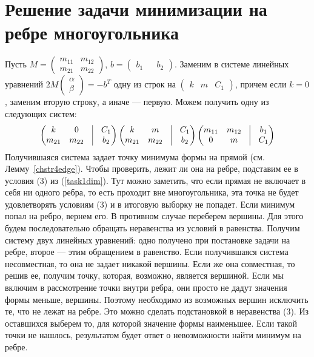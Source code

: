 \documentclass[pdftex,ptm,12pt,a4paper]{report}
\begin{document}
\section{Решение задачи минимизации на ребре многоугольника}
  Пусть $M = \begin{pmatrix} m_{11} & m_{12} \\ m_{21} & m_{22} \end{pmatrix}$,
        $b = \begin{pmatrix} b_1 && b_2 \end{pmatrix}$.
  Заменим в системе линейных уравнений $2M \begin{pmatrix} \alpha \\ \beta \end{pmatrix} = - b^T$ одну из строк на $\begin{pmatrix} k & m & C_1 \end{pmatrix}$,
  причем если $k=0$, заменим вторую строку, а иначе --- первую.
  Можем получить одну из следующих систем:
  \[
    \begin{pmatrix}
      k & 0 & \vrule & C_1 \\
      m_{21} & m_{22} & \vrule & b_2
    \end{pmatrix}
    \begin{pmatrix}
      k & m & \vrule & C_1 \\
      m_{21} & m_{22} & \vrule & b_2
    \end{pmatrix}
    \begin{pmatrix}
      m_{11} & m_{12} & \vrule & b_1 \\
      0 & m & \vrule & C_1
    \end{pmatrix}
  \]
  Получившаяся система задает точку минимума формы на прямой (см. Лемму~\ref{chstr4edge}).
  Чтобы проверить, лежит ли она на ребре, подставим ее в условия (3) из (\ref{task1dim}).
  Тут можно заметить, что если прямая не включает в себя ни одного ребра, то есть проходит вне многоугольника,
  эта точка не будет удовлетворять условиям (3) и в итоговую выборку не попадет.
  Если минимум попал на ребро, вернем его.
  В противном случае переберем вершины.
  Для этого будем последовательно обращать неравенства из условий в равенства.
  Получим систему двух линейных уравнений: одно получено при постановке задачи на ребре, второе --- этим обращением в равенство.
  Если получившаяся система несовместная, то она не задает никакой вершины.
  Если же она совместная, то решив ее, получим точку, которая, возможно, является вершиной.
  Если мы включим в рассмотрение точки внутри ребра, они просто не дадут значения формы меньше, вершины.
  Поэтому необходимо из возможных вершин исключить те, что не лежат на ребре.
  Это можно сделать подстановкой в неравенства (3).
  Из оставшихся выберем то, для которой значение формы наименьшее.
  Если такой точки не нашлось, результатом будет ответ о невозможности найти минимум на ребре.
\end{document}
